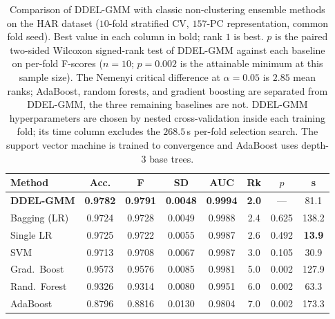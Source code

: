 \begin{table}[htbp]
			\begin{center}
				\caption{Comparison of DDEL-GMM with classic non-clustering ensemble methods on the HAR dataset ($10$-fold stratified CV, $157$-PC representation, common fold seed). Best value in each column in bold; rank $1$ is best. $p$ is the paired two-sided Wilcoxon signed-rank test of DDEL-GMM against each baseline on per-fold F-scores ($n=10$; $p=0.002$ is the attainable minimum at this sample size). The Nemenyi critical difference at $\alpha=0.05$ is $2.85$ mean ranks; AdaBoost, random forests, and gradient boosting are separated from DDEL-GMM, the three remaining baselines are not. DDEL-GMM hyperparameters are chosen by nested cross-validation inside each training fold; its time column excludes the $268.5$\,s per-fold selection search. The support vector machine is trained to convergence and AdaBoost uses depth-$3$ base trees.}
				\label{tab:noclustering}
				\setlength{\tabcolsep}{1.5pt}
				\begin{tabular}{|l|c|c|c|c|c|c|c|}
					\hline
					\textbf{Method} & \textbf{Acc.} & \textbf{F} & \textbf{SD} & \textbf{AUC} & \textbf{Rk} & \textbf{$p$} & \textbf{s} \\
					\hline
					\textbf{DDEL-GMM} & \textbf{0.9782} & \textbf{0.9791} & \textbf{0.0048} & \textbf{0.9994} & \textbf{2.0} & --- & 81.1 \\
					\hline
					Bagging (LR) \cite{breiman_bagging_1996} & 0.9724 & 0.9728 & 0.0049 & 0.9988 & 2.4 & 0.625 & 138.2 \\
					\hline
					Single LR & 0.9725 & 0.9722 & 0.0055 & 0.9987 & 2.6 & 0.492 & \textbf{13.9} \\
					\hline
					SVM & 0.9713 & 0.9708 & 0.0067 & 0.9987 & 3.0 & 0.105 & 30.9 \\
					\hline
					Grad.\ Boost \cite{friedman_greedy_2001} & 0.9573 & 0.9576 & 0.0085 & 0.9981 & 5.0 & 0.002 & 127.9 \\
					\hline
					Rand.\ Forest \cite{breiman_random_2001} & 0.9326 & 0.9314 & 0.0080 & 0.9951 & 6.0 & 0.002 & 63.3 \\
					\hline
					AdaBoost \cite{freund_decision-theoretic_1997} & 0.8796 & 0.8816 & 0.0130 & 0.9804 & 7.0 & 0.002 & 173.3 \\
					\hline
				\end{tabular}
			\end{center}
		\end{table}
